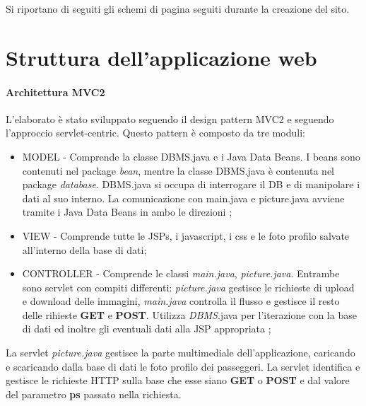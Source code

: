 \documentclass[a4paper,10pt]{article}
\begin{document}
Si riportano di seguiti gli schemi di pagina seguiti durante la creazione del sito.
 
 
 
 
 
 
 
 
\section{Struttura dell'applicazione web}

\paragraph{Architettura MVC2}
L'elaborato \`e stato sviluppato seguendo il design pattern MVC2 e seguendo l'approccio servlet-centric. Questo pattern \`e composto da tre moduli:

\begin{itemize}
 \item MODEL -  Comprende la classe DBMS.java e i Java Data Beans. I beans sono contenuti nel package \textit{bean}, mentre la classe DBMS.java \`e contenuta nel 
		package \textit{database}. DBMS.java si occupa di interrogare il DB e di manipolare i dati al suo interno. 
		La comunicazione con main.java e picture.java  avviene tramite i 
		Java Data Beans in ambo le direzioni ;
 \item VIEW - Comprende tutte le JSPs, i javascript, i css e le foto profilo salvate all'interno della base di dati;
 \item CONTROLLER - Comprende le classi \textit{main.java}, \textit{picture.java}. Entrambe sono servlet con compiti differenti: \textit{picture.java} gestisce le richieste di upload e download delle
		    immagini, \textit{main.java} controlla il flusso e gestisce il resto delle rihieste \textbf{GET} e \textbf{POST}. Utilizza \textit{DBMS}.java per l'iterazione con la base di dati ed inoltre 
		    gli eventuali dati alla JSP appropriata ;
\end{itemize}

La servlet \textit{picture.java} gestisce la parte multimediale dell'applicazione, caricando e scaricando dalla base di dati le foto profilo dei passeggeri.
La servlet identifica e gestisce le richieste HTTP sulla base che esse siano \textbf{GET} o \textbf{POST} e dal valore del parametro \textbf{ps} passato nella richiesta.
\end{document}
